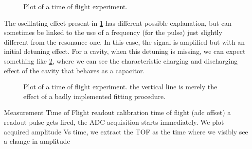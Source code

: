 \begin{figure}[ht]
    \caption{Plot of a time of flight experiment.}
    \label{fig:time_of_flight}
\end{figure}

The oscillating effect present in \cref{fig:time_of_flight} has different possible explanation, but can sometimes be linked to the use of a frequency (for the pulse) just slightly different from the resonance one.
In this case, the signal is amplified but with an initial detuning effect.
For a cavity, when this detuning is missing, we can expect something like \cref{fig:time_of_flight_2}, where we can see the characteristic charging and discharging effect of the cavity that behaves as a capacitor.

\begin{figure}[ht]
    \caption{Plot of a time of flight experiment. the vertical line is merely the effect of a badly implemented fitting procedure.}
    \label{fig:time_of_flight_2}
\end{figure}

\experimentrecap
{Measurement Time of Flight}
{readout calibration}
{time of flight (adc offset)}
{a readout pulse gets fired, the ADC acquisition starts immediately. We plot acquired amplitude Vs time, we extract the TOF as the time where we visibly see a change in amplitude}